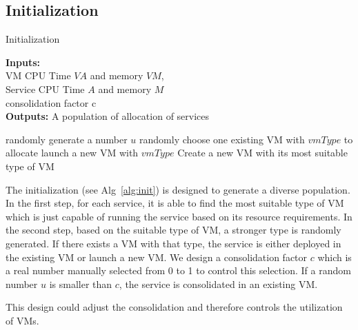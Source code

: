 \subsection{Initialization}
\label{sec:initialization_operator}
\begin{algorithm}[!htb]
 \caption{Initialization}
 \footnotesize
 \textbf{Inputs:} \\
  VM CPU Time $VA$ and memory $VM$, \\
  Service CPU Time $A$ and memory $M$ \\
  consolidation factor c \\
 \textbf{Outputs:}
  A population of allocation of services

 \begin{algorithmic}[1]
      \STATE randomly generate a number $u$
      \STATE randomly choose one existing VM with $vmType$ to allocate
      \ELSE
      \STATE launch a new VM with $vmType$
      \ENDIF
    \ELSE
      \STATE Create a new VM with its most suitable type of VM 
    \ENDIF

  \ENDFOR
 \end{algorithmic}
 \label{alg:init}
\end{algorithm}


The initialization (see Alg~\ref{alg:init}) is designed to generate a diverse population.
In the first step, for each service, it is able to find the most suitable type of VM which is just capable of running the service based on its resource requirements. 
In the second step, based on the suitable type of VM, a stronger type is randomly generated. If there exists a VM with that type, the service is either deployed in the 
existing VM or launch a new VM. We design a consolidation factor $c$ which is a real number manually selected from 0 to 1 to control this selection. If a
random number $u$ is smaller than $c$, the service is consolidated in an existing VM.

This design could adjust the consolidation and therefore controls the utilization of VMs.


